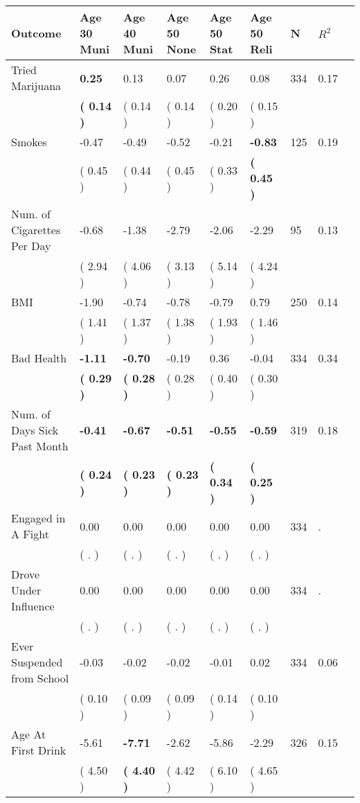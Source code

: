 \begin{tabular}{L{6.2cm} C{1.8cm} C{1.8cm} C{1.8cm} C{1.8cm} C{1.8cm} C{1.8cm} C{0.3cm} C{0.3cm}}
\toprule
 \textbf{Outcome} & \textbf{Age 30 Muni} & \textbf{Age 40 Muni} & \textbf{Age 50 None} & \textbf{Age 50 Stat} & \textbf{Age 50 Reli} & \textbf{N} & \textbf{$ R^2$} \\
\midrule
Tried Marijuana & \textbf{     0.25} &      0.13 &      0.07 &      0.26 &      0.08  & 334 &       0.17 \\ 
 & \textbf{(     0.14 )} & (     0.14 ) & (     0.14 ) & (     0.20 ) & (     0.15 )  & \\
Smokes &     -0.47 &     -0.49 &     -0.52 &     -0.21 & \textbf{    -0.83}  & 125 &       0.19 \\ 
 & (     0.45 ) & (     0.44 ) & (     0.45 ) & (     0.33 ) & \textbf{(     0.45 )}  & \\
Num. of Cigarettes Per Day &     -0.68 &     -1.38 &     -2.79 &     -2.06 &     -2.29  & 95 &       0.13 \\ 
 & (     2.94 ) & (     4.06 ) & (     3.13 ) & (     5.14 ) & (     4.24 )  & \\
BMI &     -1.90 &     -0.74 &     -0.78 &     -0.79 &      0.79  & 250 &       0.14 \\ 
 & (     1.41 ) & (     1.37 ) & (     1.38 ) & (     1.93 ) & (     1.46 )  & \\
Bad Health & \textbf{    -1.11} & \textbf{    -0.70} &     -0.19 &      0.36 &     -0.04  & 334 &       0.34 \\ 
 & \textbf{(     0.29 )} & \textbf{(     0.28 )} & (     0.28 ) & (     0.40 ) & (     0.30 )  & \\
Num. of Days Sick Past Month & \textbf{    -0.41} & \textbf{    -0.67} & \textbf{    -0.51} & \textbf{    -0.55} & \textbf{    -0.59}  & 319 &       0.18 \\ 
 & \textbf{(     0.24 )} & \textbf{(     0.23 )} & \textbf{(     0.23 )} & \textbf{(     0.34 )} & \textbf{(     0.25 )}  & \\
Engaged in A Fight &      0.00 &      0.00 &      0.00 &      0.00 &      0.00  & 334 &          . \\ 
 & (        . ) & (        . ) & (        . ) & (        . ) & (        . )  & \\
Drove Under Influence &      0.00 &      0.00 &      0.00 &      0.00 &      0.00  & 334 &          . \\ 
 & (        . ) & (        . ) & (        . ) & (        . ) & (        . )  & \\
Ever Suspended from School &     -0.03 &     -0.02 &     -0.02 &     -0.01 &      0.02  & 334 &       0.06 \\ 
 & (     0.10 ) & (     0.09 ) & (     0.09 ) & (     0.14 ) & (     0.10 )  & \\
Age At First Drink &     -5.61 & \textbf{    -7.71} &     -2.62 &     -5.86 &     -2.29  & 326 &       0.15 \\ 
 & (     4.50 ) & \textbf{(     4.40 )} & (     4.42 ) & (     6.10 ) & (     4.65 )  & \\
\bottomrule
\end{tabular}
